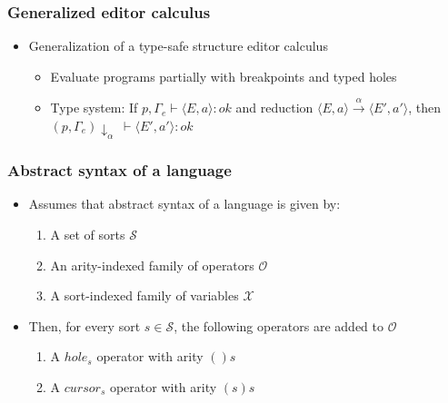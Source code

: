 \documentclass[t,24pt,aspectratio=169]{beamer}
\begin{document}
\begin{frame}
    \frametitle{Generalized editor calculus}
    \begin{itemize}
        \item Generalization of a type-safe structure editor calculus
              \begin{itemize}
                  \item Evaluate programs partially with breakpoints and typed holes
                  \item Type system: If $p,\Gamma_e \vdash \langle E, a \rangle : ok$ and reduction $\langle E,a \rangle \overset{\alpha}{\rightarrow} \langle E', a' \rangle$, then $(p,\Gamma_e)\downarrow_{\alpha} \ \vdash \langle E', a' \rangle : ok$
              \end{itemize}
    \end{itemize}

\end{frame}

\begin{frame}
    \frametitle{Abstract syntax of a language}
    \begin{itemize}
        \item Assumes that abstract syntax of a language is given by:
              \begin{enumerate}
                  \item A set of sorts $\mathcal{S}$
                  \item An arity-indexed family of operators $\mathcal{O}$
                  \item A sort-indexed family of variables $\mathcal{X}$
              \end{enumerate}
        \item Then, for every sort $s \in \mathcal{S}$, the following operators are added to $\mathcal{O}$
              \begin{enumerate}
                  \item A $hole_s$ operator with arity $()s$
                  \item A $cursor_s$ operator with arity $(s)s$
              \end{enumerate}
    \end{itemize}
\end{frame}
\end{document}
